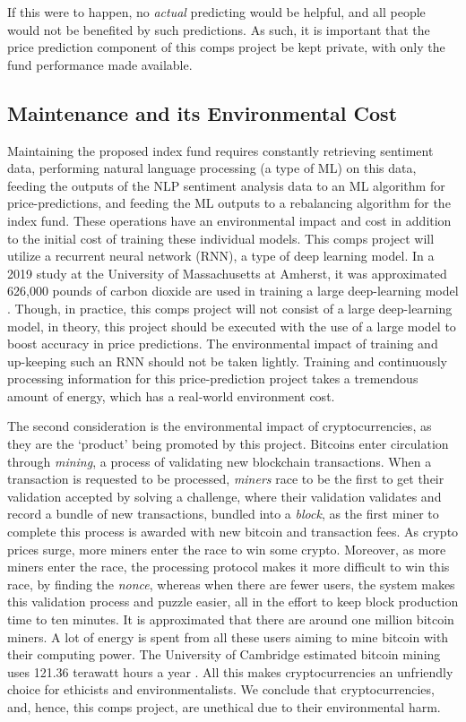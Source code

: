 \documentclass[10pt,twocolumn]{article}
\begin{document}
If this were to happen, no \textit{actual} predicting would be helpful, and all people would not be benefited by such predictions. As such, it is important that the price prediction component of this comps project be kept private, with only the fund performance made available.

\subsection{Maintenance and its Environmental Cost}

Maintaining the proposed index fund requires constantly retrieving sentiment data, performing natural language processing (a type of ML) on this data, feeding the outputs of the NLP sentiment analysis data to an ML algorithm for price-predictions, and feeding the ML outputs to a rebalancing algorithm for the index fund. These operations have an environmental impact and cost in addition to the initial cost of training these individual models. This comps project will utilize a recurrent neural network (RNN), a type of deep learning model. In a 2019 study at the University of Massachusetts at Amherst, it was approximated 626,000 pounds of carbon dioxide are used in training a large deep-learning model \cite{ShrinkingDLCarbonFootprint}. Though, in practice, this comps project will not consist of a large deep-learning model, in theory, this project should be executed with the use of a large model to boost accuracy in price predictions. The environmental impact of training and up-keeping such an RNN should not be taken lightly. Training and continuously processing information for this price-prediction project takes a tremendous amount of energy, which has a real-world environment cost.

The second consideration is the environmental impact of cryptocurrencies, as they are the `product' being promoted by this project. Bitcoins enter circulation through \textit{mining}, a process of validating new blockchain transactions. When a transaction is requested to be processed, \textit{miners} race to be the first to get their validation accepted by solving a challenge, where their validation validates and record a bundle of new transactions, bundled into a \textit{block}, as the first miner to complete this process is awarded with new bitcoin and transaction fees. As crypto prices surge, more miners enter the race to win some crypto. Moreover, as more miners enter the race, the processing protocol makes it more difficult to win this race, by finding the \textit{nonce}, whereas when there are fewer users, the system makes this validation process and puzzle easier, all in the effort to keep block production time to ten minutes. It is approximated that there are around one million bitcoin miners. A lot of energy is spent from all these users aiming to mine bitcoin with their computing power. The University of Cambridge estimated bitcoin mining uses 121.36 terawatt hours a year \cite{BitcoinImpactOnClimate}. All this makes cryptocurrencies an unfriendly choice for ethicists and environmentalists. We conclude that cryptocurrencies, and, hence, this comps project, are unethical due to their environmental harm.
\end{document}
